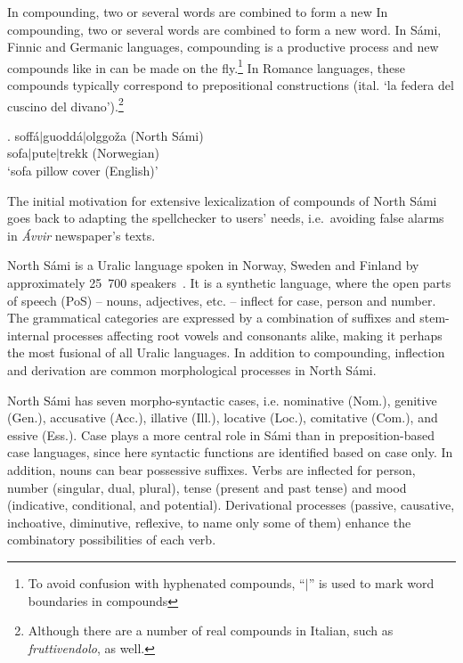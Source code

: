 \documentclass[free]{flammie}
\begin{document}
In compounding, two or several words are combined to form a new
In compounding, two or several words are combined to form a new
word. In Sámi, Finnic and Germanic languages, compounding is a
productive process and new compounds like in \Next{} can be made on
the fly.\footnote{To avoid confusion with hyphenated compounds, ``$|$'' is used to mark word boundaries in compounds}
In Romance languages, these compounds typically correspond to
prepositional constructions (ital. `la federa del cuscino del
divano').\footnote{Although there are a number of real compounds in
  Italian, such as \textit{fruttivendolo}, as well.}


\exg. soffá$|$guoddá$|$olggoža ({North Sámi})\label{sami}\\
sofa$|$pute$|$trekk (Norwegian)\\
`sofa pillow cover (English)'


The initial motivation for extensive lexicalization of compounds of
North Sámi goes back to adapting the spellchecker to users' needs,
i.e.\ avoiding false alarms in \textit{Ávvir} newspaper's texts.  %

North Sámi is a Uralic language spoken in Norway, Sweden and Finland by
approximately 25~700 speakers~\cite{Ethnologue2018}. It is a synthetic language,
where the open parts of speech (PoS) -- nouns, adjectives, etc. -- inflect for
case, person and number. The grammatical categories are expressed by a
combination of suffixes and stem-internal processes affecting root vowels and
consonants alike, making it perhaps the most fusional of all Uralic languages.
In addition to compounding, inflection and derivation are common morphological processes in North Sámi.


North Sámi has seven morpho-syntactic cases, i.e. nominative (Nom.), genitive (Gen.), accusative (Acc.), illative (Ill.), locative (Loc.), comitative (Com.), and essive (Ess.).
Case plays a more central role in Sámi than in preposition-based case languages, since here syntactic functions are identified based on case only.
In addition, nouns can bear possessive suffixes.
Verbs are inflected for person, number (singular, dual, plural), tense (present and past tense) and mood (indicative, conditional, and potential).  Derivational processes (passive, causative, inchoative, diminutive, reflexive, to name only some of them) enhance the combinatory possibilities of each verb.
\end{document}
